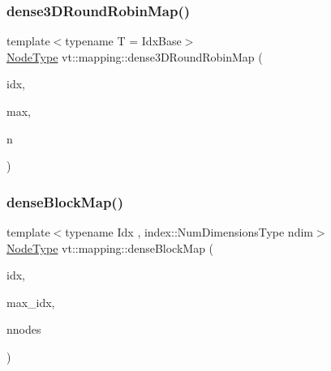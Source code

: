 \subsubsection{\texorpdfstring{dense3\+D\+Round\+Robin\+Map()}{dense3DRoundRobinMap()}}
{\footnotesize\ttfamily template$<$typename T  = Idx\+Base$>$ \\
\hyperlink{namespacevt_a866da9d0efc19c0a1ce79e9e492f47e2}{Node\+Type} vt\+::mapping\+::dense3\+D\+Round\+Robin\+Map (\begin{DoxyParamCaption}\item[{\hyperlink{namespacevt_1_1mapping_aacc737158b6517f2d760ffc8d1b5abca}{Idx3\+D\+Ptr}$<$ T $>$}]{idx,  }\item[{\hyperlink{namespacevt_1_1mapping_aacc737158b6517f2d760ffc8d1b5abca}{Idx3\+D\+Ptr}$<$ T $>$}]{max,  }\item[{\hyperlink{namespacevt_a866da9d0efc19c0a1ce79e9e492f47e2}{Node\+Type}}]{n }\end{DoxyParamCaption})}

\mbox{\label{namespacevt_1_1mapping_a290c8ece78ae8ffc8aa79dbb43a743d6}} 
\subsubsection{\texorpdfstring{dense\+Block\+Map()}{denseBlockMap()}}
{\footnotesize\ttfamily template$<$typename Idx , index\+::\+Num\+Dimensions\+Type ndim$>$ \\
\hyperlink{namespacevt_a866da9d0efc19c0a1ce79e9e492f47e2}{Node\+Type} vt\+::mapping\+::dense\+Block\+Map (\begin{DoxyParamCaption}\item[{\hyperlink{namespacevt_1_1mapping_a1bcab0d331bff853fe09c964d5e9cc8c}{Idx\+Ptr}$<$ Idx $>$}]{idx,  }\item[{\hyperlink{namespacevt_1_1mapping_a1bcab0d331bff853fe09c964d5e9cc8c}{Idx\+Ptr}$<$ Idx $>$}]{max\+\_\+idx,  }\item[{\hyperlink{namespacevt_a866da9d0efc19c0a1ce79e9e492f47e2}{Node\+Type}}]{nnodes }\end{DoxyParamCaption})}

\mbox{\label{namespacevt_1_1mapping_a4dd58859e65edd3145fc52392161c90a}} 
